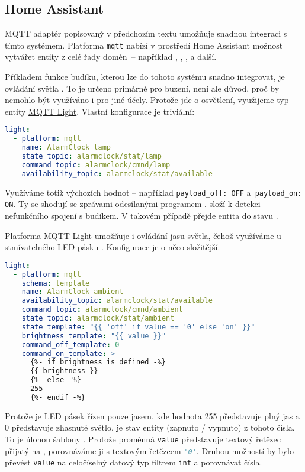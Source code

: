 \subsection{Home Assistant}




MQTT adaptér  popisovaný v předchozím textu
umožňuje snadnou integraci s tímto systémem. Platforma \texttt{mqtt} nabízí
v prostředí Home Assistant možnost vytvářet entity z celé řady domén~--
například , , ,
 a další.

Příkladem funkce budíku, kterou lze do tohoto systému snadno integrovat, je
ovládání světla . To je určeno primárně pro buzení, není ale důvod,
proč by nemohlo být využíváno i pro jiné účely. Protože jde o osvětlení,
využijeme typ entity
\href{https://www.home-assistant.io/integrations/light.mqtt}{MQTT Light}.
Vlastní konfigurace je triviální:
\begin{lstlisting}[language=yaml]
light:
  - platform: mqtt
    name: AlarmClock lamp
    state_topic: alarmclock/stat/lamp
    command_topic: alarmclock/cmnd/lamp
    availability_topic: alarmclock/stat/available
\end{lstlisting}
Využíváme totiž výchozích hodnot -- například \lstinline!payload_off: OFF!
a~\lstinline!payload_on: ON!. Ty se shodují se zprávami odesílanými programem
.  složí k detekci
nefunkčního spojení s budíkem. V takovém případě přejde entita
 do stavu .

Platforma MQTT Light umožňuje i ovládání jasu světla, čehož využíváme
u stmívatelného LED pásku . Konfigurace je o něco složitější.
\begin{lstlisting}[language=yaml]
light:
  - platform: mqtt
    schema: template
    name: AlarmClock ambient
    availability_topic: alarmclock/stat/available
    command_topic: alarmclock/cmnd/ambient
    state_topic: alarmclock/stat/ambient
    state_template: "{{ 'off' if value == '0' else 'on' }}"
    brightness_template: "{{ value }}"
    command_off_template: 0
    command_on_template: >
      {%- if brightness is defined -%}
      {{ brightness }}
      {%- else -%}
      255
      {%- endif -%}
\end{lstlisting}
Protože je LED pásek řízen pouze jasem, kde hodnota \num{255} představuje plný
jas a \num{0} představuje zhasnuté světlo, je stav entity (zapnuto / vypnuto)
z tohoto čísla. To je úlohou šablony . Protože proměnná
\texttt{value} představuje textový řetězec přijatý na ,
porovnáváme ji s textovým řetězcem \lstinline[language=Python]!'0'!. Druhou
možností by bylo převést \texttt{value} na celočíselný datový typ filtrem
\texttt{int} a porovnávat čísla.

